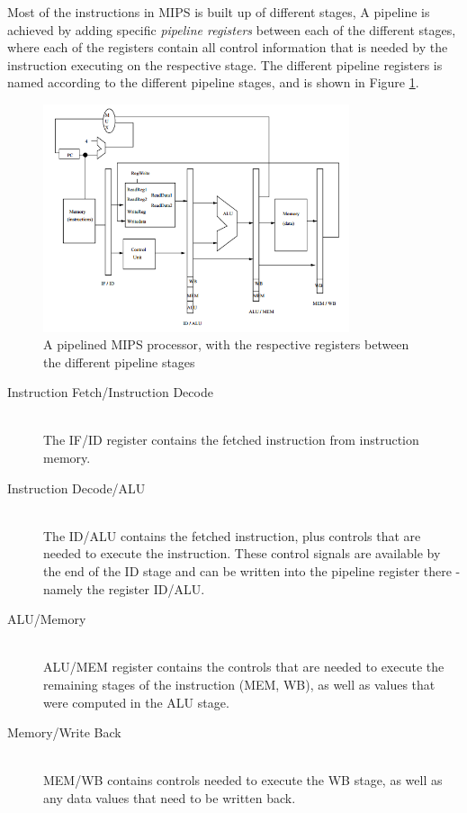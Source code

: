 Most of the instructions in MIPS is built up of different stages,
A pipeline is achieved by adding specific \textit{pipeline registers} between
each of the different stages, where each of the registers contain all control
information that is needed by the instruction executing on the respective stage.
The different pipeline registers is named according to the different pipeline stages,
and is shown in Figure \ref{pipeline-registers}.

\begin{figure}[ht]
    \centering
      \includegraphics[width=9cm]{figures/pipeline-registers}
    \caption{A pipelined MIPS processor, with the respective registers between
        the different pipeline stages}
    \label{pipeline-registers}
\end{figure}

\begin{description}
    \item[Instruction Fetch/Instruction Decode] \hfill \\
        The IF/ID register contains the fetched instruction from instruction memory.
    \item[Instruction Decode/ALU] \hfill \\
        The ID/ALU contains the fetched instruction, plus controls that 
        are needed to execute the instruction. These control
        signals are available by the end of the ID stage and can be written into the pipeline register there - namely the register ID/ALU.
    \item[ALU/Memory] \hfill \\
        ALU/MEM register contains the controls that are needed to execute
        the remaining stages of the instruction (MEM, WB), as well as values 
        that were computed in the ALU stage.
    \item[Memory/Write Back] \hfill \\
        MEM/WB contains controls needed to execute the WB stage, as well as any data
        values that need to be written back.
\end{description}